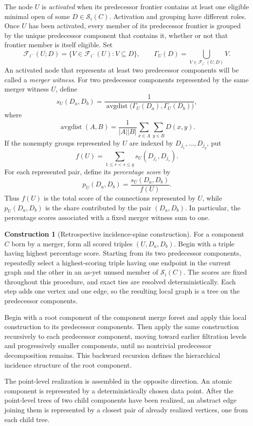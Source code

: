 \documentclass[a4paper,11pt]{article}
\theoremstyle{definition}
\newtheorem{construction}[construction]{Construction}
\theoremstyle{remark}
\begin{document}
The node $U$ is \emph{activated} when its predecessor frontier contains at least one eligible minimal open of some $D\in\mathcal S_i(C)$. Activation and grouping have different roles. Once $U$ has been activated, every member of its predecessor frontier is grouped by the unique predecessor component that contains it, whether or not that frontier member is itself eligible. Set
$$
\mathcal F_{i^-}(U;D) = \{V\in\mathcal F_{i^-}(U)\colon V\subseteq D\},\qquad \Gamma_U(D) = \bigcup_{V\in\mathcal F_{i^-}(U;D)}V.
$$
An activated node that represents at least two predecessor components will be called a \emph{merger witness}. For two predecessor components represented by the same merger witness $U$, define
$$
s_U(D_a,D_b) = \frac{1}{\operatorname{avgdist}\bigl(\Gamma_U(D_a),\Gamma_U(D_b)\bigr)},
$$
where
$$
\operatorname{avgdist}(A,B) = \frac{1}{|A||B|}\sum_{x\in A}\sum_{y\in B}D(x,y).
$$
If the nonempty groups represented by $U$ are indexed by $D_{j_1},\ldots,D_{j_q}$, put
$$
f(U) = \sum_{1\leq r<s\leq q}s_U(D_{j_r},D_{j_s}).
$$
For each represented pair, define its \emph{percentage score} by
$$
p_U(D_a,D_b) = \frac{s_U(D_a,D_b)}{f(U)}.
$$
Thus $f(U)$ is the total score of the connections represented by $U$, while $p_U(D_a,D_b)$ is the share contributed by the pair $(D_a,D_b)$. In particular, the percentage scores associated with a fixed merger witness sum to one.

\begin{construction}[Retrospective incidence-spine construction]
\label{constr:incidence-spine}
For a component $C$ born by a merger, form all scored triples $(U,D_a,D_b)$. Begin with a triple having highest percentage score. Starting from its two predecessor components, repeatedly select a highest-scoring triple having one endpoint in the current graph and the other in an as-yet unused member of $\mathcal S_i(C)$. The scores are fixed throughout this procedure, and exact ties are resolved deterministically. Each step adds one vertex and one edge, so the resulting local graph is a tree on the predecessor components.

Begin with a root component of the component merge forest and apply this local construction to its predecessor components. Then apply the same construction recursively to each predecessor component, moving toward earlier filtration levels and progressively smaller components, until no nontrivial predecessor decomposition remains. This backward recursion defines the hierarchical incidence structure of the root component.

The point-level realization is assembled in the opposite direction. An atomic component is represented by a deterministically chosen data point. After the point-level trees of two child components have been realized, an abstract edge joining them is represented by a closest pair of already realized vertices, one from each child tree.
\end{construction}
\end{document}

